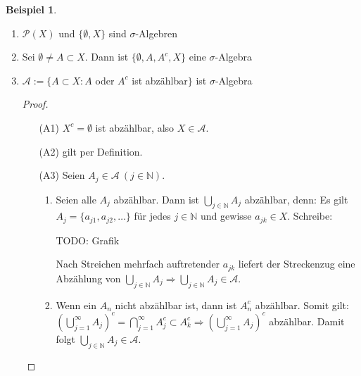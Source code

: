 \documentclass[a4paper]{scrreprt}
\newcommand{\PowerSet}{\mathcal{P}}
\newcommand{\N}{\mathbb{N}}
\newcommand{\jlabel}[1]{\label{j_#1}}
\theoremstyle{plain}
\theoremstyle{definition}
\newtheorem{expl}[thm]{Beispiel}
\begin{document}
\jlabel{Bsp 1.2}
\begin{expl}
    \begin{enumerate}
        \item $\PowerSet(X)$ und $\{\emptyset, X\}$ sind $\sigma$-Algebren
        \item Sei $\emptyset \ne A \subset X$. Dann ist $\{\emptyset, A, A^c, X\}$ eine $\sigma$-Algebra
        \item $\mathcal{A} := \{A \subset X : A$ oder $A^c$ ist abzählbar$\}$ ist $\sigma$-Algebra
            \begin{proof} 
                \begin{enumerate}
                    \item[(A1)] $X^c = \emptyset$ ist abzählbar, also $X \in \mathcal{A}$.
                    \item[(A2)] gilt per Definition.
                    \item[(A3)] Seien $A_j \in \mathcal{A} \ (j \in \N)$.
                        \begin{enumerate}
                            \item
                                Seien alle $A_j$ abzählbar. Dann ist $\bigcup_{j \in \N} A_j$ abzählbar, denn: Es gilt $A_j = \{a_{j1}, a_{j2}, \dots\}$      für jedes $j \in \N$ und gewisse $a_{jk} \in X$. Schreibe:
                                
                                \vspace{12pt}
                                
                                TODO: Grafik
                                
                                \vspace{12pt}
                            
                                Nach Streichen mehrfach auftretender $a_{jk}$ liefert der Streckenzug eine Abzählung von $\bigcup_{j \in \N} A_j \Rightarrow \bigcup_{j\in\N}A_j \in \mathcal{A}$.
                            \item
                                Wenn ein $A_n$ nicht abzählbar ist, dann ist $A_n^c$ abzählbar. Somit gilt:\\
                                $\left( \bigcup_{j=1}^\infty A_j \right)^c = \bigcap_{j=1}^\infty A_j^c \subset A_k^c \Rightarrow \left( \bigcup_{j=1}^\infty A_j \right)^c$ abzählbar. Damit folgt $\bigcup_{j \in\N} A_j \in \mathcal{A}$.
                        \end{enumerate}
                \end{enumerate}
            \end{proof}

    \end{enumerate}

\end{expl}
\end{document}
